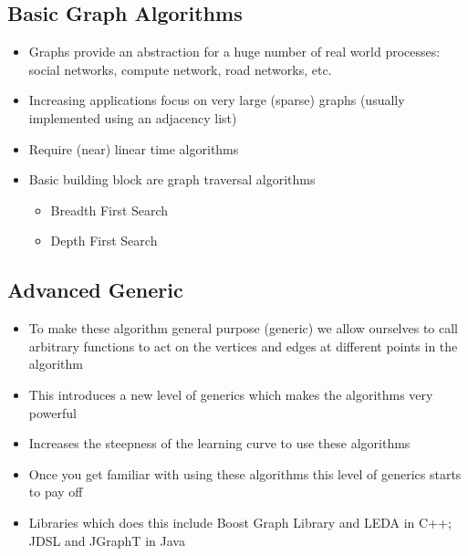 \begin{slide}
\section{Basic Graph Algorithms}

\begin{PauseHighLight}
  \begin{itemize}
  \item Graphs provide an abstraction for a huge number of real world
    processes: social networks, compute network, road networks, etc.\pause
  \item Increasing applications focus on very large (sparse) graphs
    (usually implemented using an adjacency list)\pause
  \item Require (near) linear time algorithms\pause
  \item Basic building block are graph traversal algorithms
    \begin{itemize}
    \item Breadth First Search
    \item Depth First Search\pause
    \end{itemize}
  \end{itemize}
\end{PauseHighLight}

\end{slide}


\begin{slide}
\section[-2]{Advanced Generic}

\begin{PauseHighLight}
  \begin{itemize}
  \item To make these algorithm general purpose (generic) we allow
    ourselves to call arbitrary functions to act on the vertices and
    edges at different points in the algorithm\pause
  \item This introduces a new level of generics which makes the
    algorithms very powerful\pause
  \item Increases the steepness of the learning curve to use these
    algorithms\pause
  \item Once you get familiar with using these algorithms this level of
    generics starts to pay off\pause
  \item Libraries which does this include Boost Graph Library and LEDA
    in C++; JDSL and  JGraphT in Java\pause
  \end{itemize}
\end{PauseHighLight}

\end{slide}

